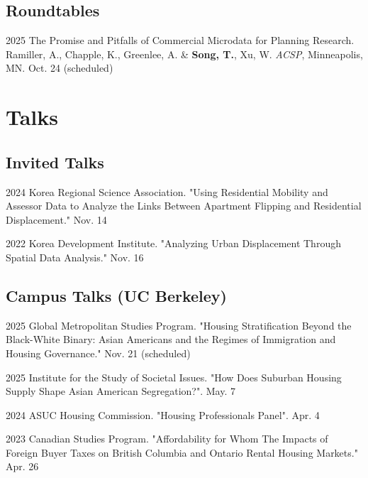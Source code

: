 \documentclass[11pt,letterpaper]{article}
\newcommand{\term}[1]{(#1)}
\begin{document}
\subsection{Roundtables}
\begin{tablist}
  \item[2025] \tab{}The Promise and Pitfalls of Commercial Microdata for Planning Research. Ramiller, A., Chapple, K., Greenlee, A. \& \textbf{Song, T.}, Xu, W. \emph{ACSP}, Minneapolis, MN. Oct. 24 \term{scheduled}
\end{tablist}

\section{Talks}

\subsection{Invited Talks}
\begin{tablist}
  \item[2024] \tab{}Korea Regional Science Association. "Using Residential Mobility and Assessor Data to Analyze the Links Between Apartment Flipping and Residential Displacement." Nov. 14
  \item[2022] \tab{}Korea Development Institute. "Analyzing Urban Displacement Through Spatial Data Analysis." Nov. 16
\end{tablist}

\subsection{Campus Talks (UC Berkeley)} 
\begin{tablist}
  \item[2025] \tab{}Global Metropolitan Studies Program. "Housing Stratification Beyond the Black-White Binary: Asian Americans and the Regimes of Immigration and Housing Governance." Nov. 21 \term{scheduled}
  \item[2025] \tab{}Institute for the Study of Societal Issues. "How Does Suburban Housing Supply Shape Asian American Segregation?". May. 7
  \item[2024] \tab{}ASUC Housing Commission. "Housing Professionals Panel". Apr. 4
  \item[2023] \tab{}Canadian Studies Program. "Affordability for Whom The Impacts of Foreign Buyer Taxes on British Columbia and Ontario Rental Housing Markets." Apr. 26
\end{tablist}
\end{document}
